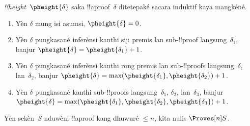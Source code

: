 \documentclass[../../../include/open-logic-section]{subfiles}
\begin{document}


\begin{defn}
\emph{!!{height}}~$\pheight{\delta}$ saka !!a{proof}~$\delta$
ditetepaké sacara induktif kaya mangkéné.
\begin{enumerate}
  \item Yèn $\delta$ mung isi asumsi, $\pheight{\delta} = 0$.
  \item Yèn $\delta$ pungkasané inferènsi kanthi siji premis lan
  sub-!!{proof} langsung~$\delta_1$, banjur $\pheight{\delta} = \pheight{\delta_1} + 1$.
  \item Yèn $\delta$ pungkasané inferènsi kanthi rong premis lan
  sub-!!{proof}s langsung~$\delta_1$ lan~$\delta_2$, banjur $\pheight{\delta} =
  \max(\pheight{\delta_1}, \pheight{\delta_2}) + 1$.
  \item Yèn $\delta$ pungkasané \Elim{\lor} kanthi
  sub-!!{proof}s langsung~$\delta_1$, $\delta_2$, lan~$\delta_3$, banjur $\pheight{\delta} =
  \max(\pheight{\delta_1}, \pheight{\delta_2}, \pheight{\delta_3}) + 1$.
\end{enumerate}
Yèn sekèn~$S$ nduwèni !!a{proof} kang dhuwuré $\le n$,
kita nulis $\Proves[n] S$.
\end{defn}
\end{document}
